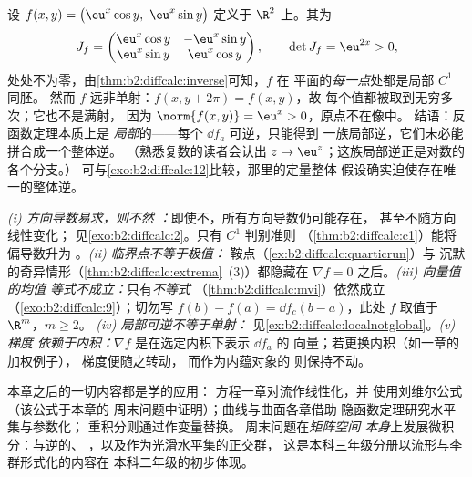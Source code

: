 \begin{example}\label{ex:b2:diffcalc:localnotglobal}
设 $f(x, y) = \bigl(\eu^x\cos y,\ \eu^x\sin y\bigr)$ 定义于
$\R^2$ 上。其为
\[
J_f = \begin{pmatrix}
\eu^x\cos y & -\eu^x\sin y\\
\eu^x\sin y & \eu^x\cos y
\end{pmatrix},
\qquad
\det J_f = \eu^{2x} > 0 ,
\]
处处不为零，由\cref{thm:b2:diffcalc:inverse}可知，$f$ 在
平面的\emph{每一点}处都是局部 $C^1$ 同胚。
然而 $f$ 远非单射：$f(x, y + 2\pi) = f(x, y)$，故
每个值都被取到无穷多次；它也不是满射，
因为 $\norm{f(x, y)} = \eu^x > 0$，原点不在像中。
结语：反函数定理本质上是
\emph{局部}的——每个 $\dd f_a$ 可逆，只能得到
一族局部逆，它们未必能拼合成一个整体逆。
（熟悉复数的读者会认出 $z \mapsto
\eu^z$；这族局部逆正是对数的各个分支。）
可与\cref{exo:b2:diffcalc:12}比较，那里的定量整体
假设确实迫使存在唯一的整体逆。
\end{example}

\begin{remark}[常见误区]
\emph{(i) 方向导数易求，则不然
：}即使不，所有方向导数仍可能存在，
甚至不随方向线性变化；
见\cref{exo:b2:diffcalc:2}。只有 $C^1$
判别准则
（\cref{thm:b2:diffcalc:c1}）能将偏导数升为
。\emph{(ii) 临界点不等于极值：}
鞍点（\cref{ex:b2:diffcalc:quarticrun}）与
沉默的奇异情形（\cref{thm:b2:diffcalc:extrema}~(3)）都隐藏在
$\nabla f = 0$ 之后。\emph{(iii) 向量值的均值
等式不成立：}只有\emph{不等式}
（\cref{thm:b2:diffcalc:mvi}）依然成立
（\cref{exo:b2:diffcalc:9}）；切勿写 $f(b) - f(a) = \dd
f_c(b-a)$，此处 $f$ 取值于 $\R^m$，$m \geq 2$。
\emph{(iv) 局部可逆不等于单射：}
见\cref{ex:b2:diffcalc:localnotglobal}。\emph{(v) 梯度
依赖于内积：}$\nabla f$ 是在选定内积下表示 $\dd f_a$ 的
向量；若更换内积（如一章的加权例子），
梯度便随之转动，
而作为内蕴对象的
则保持不动。
\end{remark}

\begin{remark}[应用场合]
本章之后的一切内容都是学的应用：
方程一章对流作线性化，并
使用刘维尔公式（该公式于本章的
周末问题中证明）；曲线与曲面各章借助
隐函数定理研究水平集与参数化；
重积分则通过作变量替换。
周末问题在\emph{矩阵空间
本身}上发展微积分：与逆的、
，以及作为光滑水平集的正交群，
这是本科三年级分册以流形与李群形式化的内容在
本科二年级的初步体现。
\end{remark}


